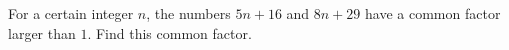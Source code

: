 For a certain integer $n$, the numbers $5n+16$ and $8n+29$ have a common factor larger than $1$. Find this common factor.
